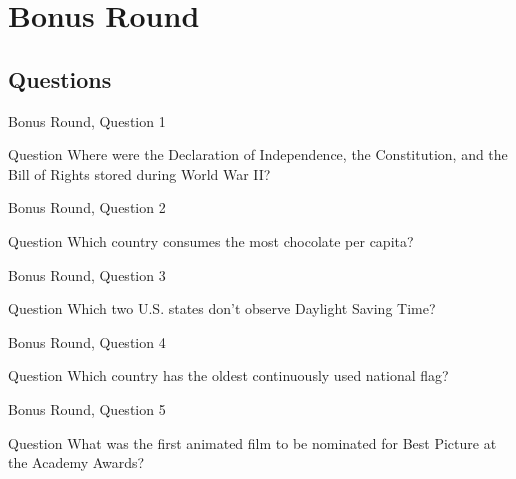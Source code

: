 \documentclass[11pt]{beamer}
\begin{document}
\section{Bonus Round}

\subsection{Questions}

\begin{frame}[t]{Bonus Round, Question 1}
  \vspace{2em}
  \begin{block}{Question}
    Where were the Declaration of Independence, the Constitution, and the Bill of Rights stored during World War II\@?
  \end{block}
\end{frame}


\begin{frame}[t]{Bonus Round, Question 2}
  \vspace{2em}
  \begin{block}{Question}
    Which country consumes the most chocolate per capita\@?
  \end{block}
\end{frame}


\begin{frame}[t]{Bonus Round, Question 3}
  \vspace{2em}
  \begin{block}{Question}
    Which two U.S. states don't observe Daylight Saving Time\@?
  \end{block}
\end{frame}


\begin{frame}[t]{Bonus Round, Question 4}
  \vspace{2em}
  \begin{block}{Question}
    Which country has the oldest continuously used national flag\@?
  \end{block}
\end{frame}


\begin{frame}[t]{Bonus Round, Question 5}
  \vspace{2em}
  \begin{block}{Question}
    What was the first animated film to be nominated for Best Picture at the Academy Awards\@?
  \end{block}
\end{frame}
\end{document}
